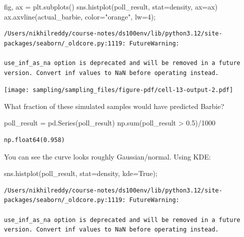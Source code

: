 \documentclass[
  letterpaper,
  DIV=11,
  numbers=noendperiod]{scrreprt}
\newenvironment{Shaded}{\begin{snugshade}}{\end{snugshade}}
\newcommand{\BuiltInTok}[1]{\textcolor[rgb]{0.00,0.23,0.31}{#1}}
\newcommand{\DecValTok}[1]{\textcolor[rgb]{0.68,0.00,0.00}{#1}}
\newcommand{\FloatTok}[1]{\textcolor[rgb]{0.68,0.00,0.00}{#1}}
\newcommand{\NormalTok}[1]{\textcolor[rgb]{0.00,0.23,0.31}{#1}}
\newcommand{\OperatorTok}[1]{\textcolor[rgb]{0.37,0.37,0.37}{#1}}
\newcommand{\StringTok}[1]{\textcolor[rgb]{0.13,0.47,0.30}{#1}}
\newcommand{\VariableTok}[1]{\textcolor[rgb]{0.07,0.07,0.07}{#1}}
\begin{document}
\begin{Shaded}
\begin{Highlighting}[]
\NormalTok{fig, ax }\OperatorTok{=}\NormalTok{ plt.subplots()}
\NormalTok{sns.histplot(poll\_result, stat}\OperatorTok{=}\StringTok{\textquotesingle{}density\textquotesingle{}}\NormalTok{, ax}\OperatorTok{=}\NormalTok{ax)}
\NormalTok{ax.axvline(actual\_barbie, color}\OperatorTok{=}\StringTok{"orange"}\NormalTok{, lw}\OperatorTok{=}\DecValTok{4}\NormalTok{)}\OperatorTok{;}
\end{Highlighting}
\end{Shaded}

\begin{verbatim}
/Users/nikhilreddy/course-notes/ds100env/lib/python3.12/site-packages/seaborn/_oldcore.py:1119: FutureWarning:

use_inf_as_na option is deprecated and will be removed in a future version. Convert inf values to NaN before operating instead.
\end{verbatim}

\texttt{[image: sampling/sampling\_files/figure-pdf/cell-13-output-2.pdf]}

What fraction of these simulated samples would have predicted Barbie?

\begin{Shaded}
\begin{Highlighting}[]
\NormalTok{poll\_result }\OperatorTok{=}\NormalTok{ pd.Series(poll\_result)}
\NormalTok{np.}\BuiltInTok{sum}\NormalTok{(poll\_result }\OperatorTok{\textgreater{}} \FloatTok{0.5}\NormalTok{)}\OperatorTok{/}\DecValTok{1000}
\end{Highlighting}
\end{Shaded}

\begin{verbatim}
np.float64(0.958)
\end{verbatim}

You can see the curve looks roughly Gaussian/normal. Using KDE:

\begin{Shaded}
\begin{Highlighting}[]
\NormalTok{sns.histplot(poll\_result, stat}\OperatorTok{=}\StringTok{\textquotesingle{}density\textquotesingle{}}\NormalTok{, kde}\OperatorTok{=}\VariableTok{True}\NormalTok{)}\OperatorTok{;}
\end{Highlighting}
\end{Shaded}

\begin{verbatim}
/Users/nikhilreddy/course-notes/ds100env/lib/python3.12/site-packages/seaborn/_oldcore.py:1119: FutureWarning:

use_inf_as_na option is deprecated and will be removed in a future version. Convert inf values to NaN before operating instead.
\end{verbatim}
\end{document}
